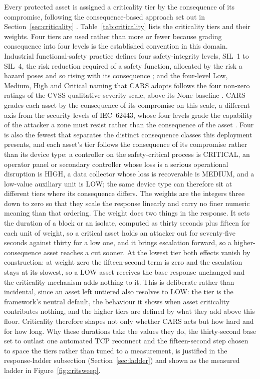 Every protected asset is assigned a criticality tier by the consequence of its compromise, following the consequence-based approach set out in Section~\ref{sec:criticality} \cite{inl2016cce, cisa2025assetinventory}. Table~\ref{tab:criticality} lists the criticality tiers and their weights. Four tiers are used rather than more or fewer because grading consequence into four levels is the established convention in this domain. Industrial functional-safety practice defines four safety-integrity levels, SIL~1 to SIL~4, the risk reduction required of a safety function, allocated by the risk a hazard poses and so rising with its consequence \cite{iec61508}; and the four-level Low, Medium, High and Critical naming that CARS adopts follows the four non-zero ratings of the CVSS qualitative severity scale, above its None baseline \cite{first2019cvss31}. CARS grades each asset by the consequence of its compromise on this scale, a different axis from the security levels of IEC~62443, whose four levels grade the capability of the attacker a zone must resist rather than the consequence of the asset \cite{iec62443_33}. Four is also the fewest that separates the distinct consequence classes this deployment presents, and each asset's tier follows the consequence of its compromise rather than its device type: a controller on the safety-critical process is CRITICAL, an operator panel or secondary controller whose loss is a serious operational disruption is HIGH, a data collector whose loss is recoverable is MEDIUM, and a low-value auxiliary unit is LOW; the same device type can therefore sit at different tiers where its consequence differs. The weights are the integers three down to zero so that they scale the response linearly and carry no finer numeric meaning than that ordering. The weight does two things in the response. It sets the duration of a block or an isolate, computed as thirty seconds plus fifteen for each unit of weight, so a critical asset holds an attacker out for seventy-five seconds against thirty for a low one, and it brings escalation forward, so a higher-consequence asset reaches a cut sooner. At the lowest tier both effects vanish by construction: at weight zero the fifteen-second term is zero and the escalation stays at its slowest, so a LOW asset receives the base response unchanged and the criticality mechanism adds nothing to it. This is deliberate rather than incidental, since an asset left untiered also resolves to LOW: the tier is the framework's neutral default, the behaviour it shows when asset criticality contributes nothing, and the higher tiers are defined by what they add above this floor. Criticality therefore shapes not only whether CARS acts but how hard and for how long. Why these durations take the values they do, the thirty-second base set to outlast one automated TCP reconnect and the fifteen-second step chosen to space the tiers rather than tuned to a measurement, is justified in the response-ladder subsection (Section~\ref{sec:ladder}) and shown as the measured ladder in Figure~\ref{fig:critsweep}.

